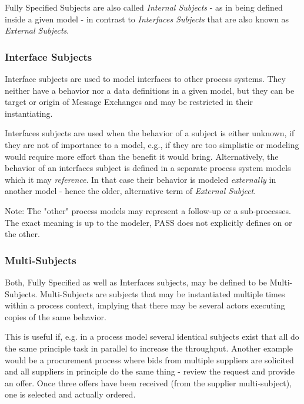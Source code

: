 Fully Specified Subjects are also called \textit{Internal Subjects} - as in being defined inside a given model - in contrast to \textit{Interfaces Subjects} that are also known as \textit{External Subjects}.

\subsubsection{Interface Subjects}

Interface subjects are used to model interfaces to other process systems. They neither have a behavior nor a data definitions in a given model, but they can be target or origin of Message Exchanges and may be restricted in their instantiating.

Interfaces subjects are used when the behavior of a subject is either unknown, if they are not of importance to a model, e.g., if they are too simplistic or modeling would require more effort than the benefit it would bring. Alternatively, the behavior of an interfaces subject is defined in a separate process system models which it may \textit{reference}. In that case their behavior is modeled \textit{externally} in another model - hence the older, alternative term of \textit{External Subject}.

Note: The "other" process models may represent a follow-up or a sub-processes. The exact meaning is up to the modeler, PASS does not explicitly defines on or the other.

\subsubsection{Multi-Subjects}

Both, Fully Specified as well as Interfaces subjects, may be defined to be Multi-Subjects. Multi-Subjects are subjects that may be instantiated multiple times within a process context, implying that there may be several actors executing copies of the same behavior.

This is useful if, e.g. in a process model several identical subjects exist that all do the same principle task in parallel to increase the throughput.  Another example would be a procurement process where bids from multiple suppliers are solicited and all suppliers in principle do the same thing - review the request and provide an offer. Once three offers have been received (from the supplier multi-subject), one is selected and actually ordered.

 
